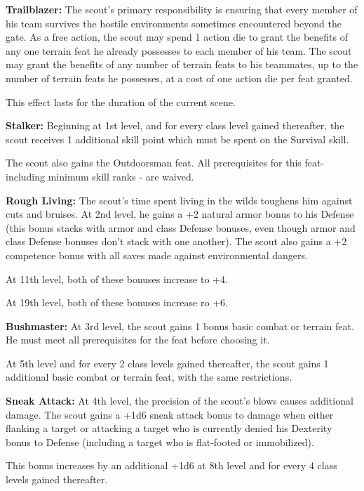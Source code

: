 \textbf{Trailblazer:} The scout's primary responsibility is ensuring that every member of his team survives the hostile environments sometimes encountered beyond the gate. As a free action, the scout may spend 1 action die to grant the benefits of any one terrain feat he already possesses to each member of his team. The scout may grant the benefits of any number of terrain feats to his teammates, up to the number of terrain feats he possesses, at a cost of one action die per feat granted.

This effect lasts for the duration of the current scene. 

\vspace*{5pt}

\textbf{Stalker:} Beginning at 1st level, and for every class level gained thereafter, the scout receives 1 additional skill point which must be spent on the Survival skill.

The scout also gains the Outdoorsman feat. All prerequisites for this feat- including minimum skill ranks - are waived.

\textbf{Rough Living:} The scout's time spent living in the wilds toughens him against cuts and bruises. At 2nd level, he gains a +2 natural armor bonus to his Defense (this bonus stacks with armor and class Defense bonuses, even though armor and class Defense bonuses don't stack with one another). The scout also gains a +2 competence bonus with all saves made against environmental dangers.

At 11th level, both of these bonuses increase to +4.

At 19th level, both of these bonuses increase ro +6.

\textbf{Bushmaster:} At 3rd level, the scout gains 1 bonus basic combat or terrain feat. He must meet all prerequisites for the feat before choosing it.

At 5th level and for every 2 class levels gained thereafter, the scout gains 1 additional basic combat or terrain feat, with the same restrictions.

\textbf{Sneak Attack:} At 4th level, the precision of the scout's blows causes additional damage. The scout gains a +1d6 sneak attack bonus to damage when either flanking a target or attacking a target who is currently denied his Dexterity bonus to Defense (including a target who is flat-footed or immobilized).

This bonus increases by an additional +1d6 at 8th level and for every 4 class levels gained thereafter.

